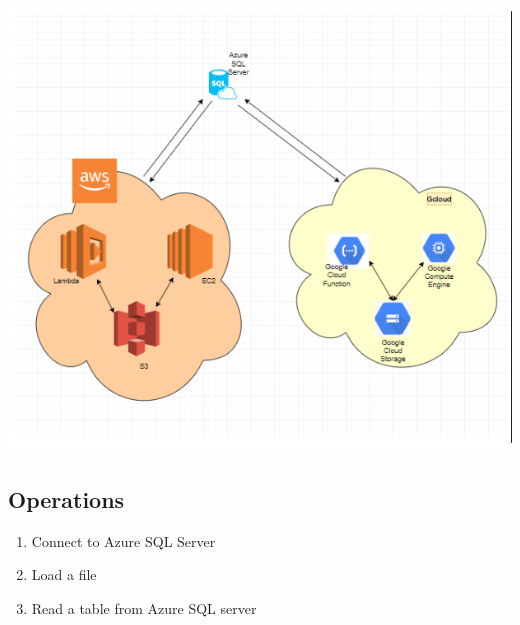 \begin{center}
\includegraphics[scale=0.75]{figures/experiments/AWS_Google_to_AzureDB.png}
\end{center}

\subsection{Operations}
 \begin{enumerate} 
 	\item Connect to Azure SQL Server 
 	\item Load a file
 	\item Read a table from Azure SQL server 
 \end{enumerate}

